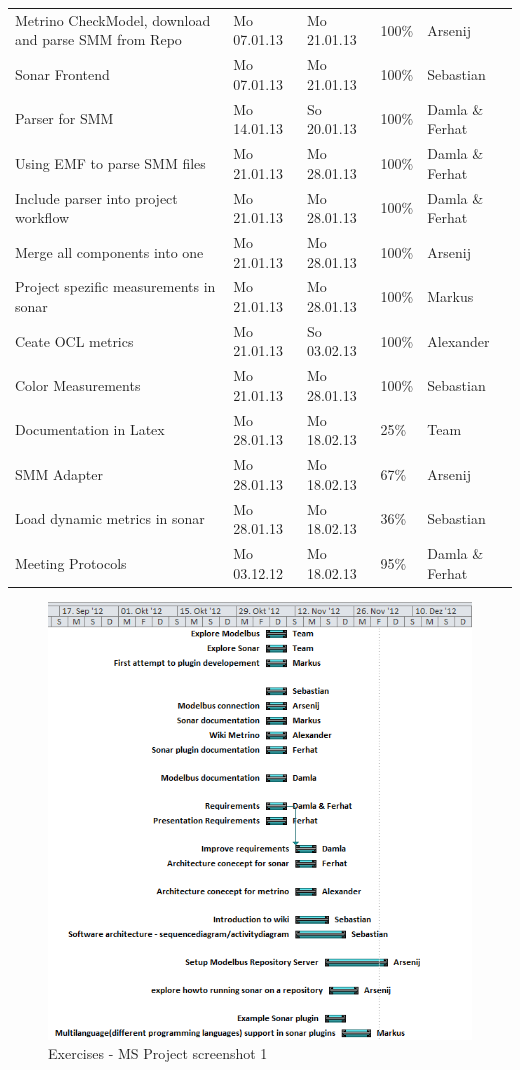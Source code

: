 \begin{longtable}{|p{6cm}|p{2.5cm}|p{2.5cm}|p{1.7cm}|p{1.8cm}|}
Metrino CheckModel, download and parse SMM from Repo & Mo 07.01.13 & Mo 21.01.13 & 100\% & Arsenij \\ 
Sonar Frontend & Mo 07.01.13 & Mo 21.01.13 & 100\% & Sebastian \\ 
Parser for SMM & Mo 14.01.13 & So 20.01.13 & 100\% & Damla \& Ferhat \\ 
Using EMF to parse SMM files & Mo 21.01.13 & Mo 28.01.13 & 100\% & Damla \& Ferhat \\
Include parser into project workflow & Mo 21.01.13 & Mo 28.01.13 & 100\% & Damla \& Ferhat \\ 
Merge all components into one & Mo 21.01.13 & Mo 28.01.13 & 100\% & Arsenij \\ 
Project spezific measurements in sonar & Mo 21.01.13 & Mo 28.01.13 & 100\% & Markus \\ 
Ceate OCL metrics & Mo 21.01.13 & So 03.02.13 & 100\% & Alexander \\ 
Color Measurements & Mo 21.01.13 & Mo 28.01.13 & 100\% & Sebastian \\ 
Documentation in Latex & Mo 28.01.13 & Mo 18.02.13 & 25\% & Team \\ 
SMM Adapter & Mo 28.01.13 & Mo 18.02.13 & 67\% & Arsenij \\ 
Load dynamic metrics in sonar & Mo 28.01.13 & Mo 18.02.13 & 36\% & Sebastian \\ 
Meeting Protocols & Mo 03.12.12 & Mo 18.02.13 & 95\% & Damla \& Ferhat \\
\hline
\end{longtable}

\newpage

\begin{figure}[htb]
\begin{center}
\includegraphics[width=\textwidth]{msp_part1}
\caption{Exercises - MS Project screenshot 1}
\end{center}
\end{figure}

